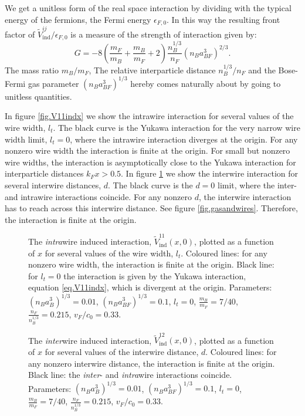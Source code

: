 We get a unitless form of the real space interaction by dividing with the typical energy of the fermions, the Fermi energy $\epsilon_{F,0}$. In this way the resulting front factor of $\tilde{V}^{ij}_{\text{ind}} / \epsilon_{F,0}$ is a measure of the strength of interaction given by:
\begin{equation}
G = - 8\left( \frac{m_F}{m_B} + \frac{m_B}{m_F} + 2 \right) \frac{n_B^{1/3}}{n_F}(n_Ba_{BF}^3)^{2/3}.
\label{eq.interactionstrength.wires}
\end{equation}
The mass ratio $m_B / m_F$, The relative interparticle distance $n_B^{1/3} / n_F$ and the Bose-Fermi gas parameter $(n_Ba_{BF}^3)^{1/3}$ hereby comes naturally about by going to unitless quantities. 

In figure \ref{fig.V11indx} we show the intrawire interaction for several values of the wire width, $l_t$. The black curve is the Yukawa interaction for the very narrow wire width limit, $l_t = 0$, where the intrawire interaction diverges at the origin. For any nonzero wire width the interaction is finite at the origin. For small but nonzero wire widths, the interaction is asymptotically close to the Yukawa interaction for interparticle distances $k_Fx > 0.5$. In figure \ref{fig.V12indx} we show the interwire interaction for several interwire distances, $d$. The black curve is the $d = 0$ limit, where the inter- and intrawire interactions coincide. For any nonzero $d$, the interwire interaction has to reach across this interwire distance. See figure \ref{fig.gasandwires}. Therefore, the interaction is finite at the origin. 

\begin{figure} 
\begin{center}
  
\caption{The \textit{intra}wire induced interaction, $\tilde{V}^{11}_{\text{ind}}(x, 0)$, plotted as a function of $x$ for several values of the wire width, $l_t$. Coloured lines: for any nonzero wire width, the interaction is finite at the origin. Black line: for $l_t = 0$ the interaction is given by the Yukawa interaction, equation \eqref{eq.V11indx}, which is divergent at the origin. Parameters: $(n_Ba_B^3)^{1/3} = 0.01$, $(n_Ba_{BF}^3)^{1/3} = 0.1$, $l_t = 0$, $\frac{m_B}{m_F} = 7/40$, $\frac{n_F}{n_B^{1/3}} = 0.215$, $v_F/c_0 = 0.33$.}
\label{fig.V11indx}   
\vspace{0.5cm}
  
\caption{The \textit{inter}wire induced interaction, $\tilde{V}^{12}_{\text{ind}}(x, 0)$, plotted as a function of $x$ for several values of the interwire distance, $d$. Coloured lines: for any nonzero interwire distance, the interaction is finite at the origin. Black line: the \textit{inter}- and \textit{intra}wire interactions coincide. \\ Parameters: $(n_Ba_B^3)^{1/3} = 0.01$, $(n_Ba_{BF}^3)^{1/3} = 0.1$, $l_t = 0$, $\frac{m_B}{m_F} = 7/40$, $\frac{n_F}{n_B^{1/3}} = 0.215$, $v_F/c_0 = 0.33$.}  
\label{fig.V12indx}  
\end{center}    
\end{figure}

